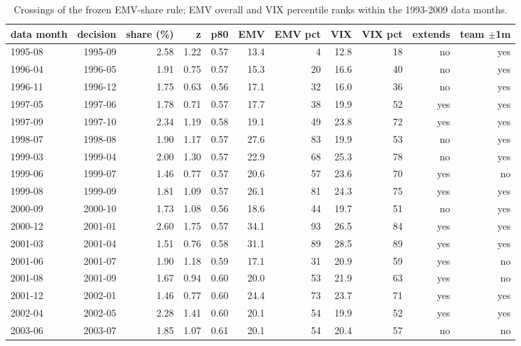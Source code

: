 \begin{table}[H]
\centering\footnotesize
\setlength{\tabcolsep}{4pt}
\caption{Crossings of the frozen EMV-share rule; EMV overall and VIX percentile ranks within the 1993-2009 data months.}
\label{tab:m8_crossings}
\begin{adjustbox}{max width=\linewidth}
\begin{tabular}{lrrrrrrrrrr}
\toprule
data month & decision & share (\%) & z & p80 & EMV & EMV pct & VIX & VIX pct & extends & team $\pm$1m \\
\midrule
1995-08 & 1995-09 & 2.58 & 1.22 & 0.57 & 13.4 & 4 & 12.8 & 18 & no & yes \\
1996-04 & 1996-05 & 1.91 & 0.75 & 0.57 & 15.3 & 20 & 16.6 & 40 & no & yes \\
1996-11 & 1996-12 & 1.75 & 0.63 & 0.56 & 17.1 & 32 & 16.0 & 36 & no & yes \\
1997-05 & 1997-06 & 1.78 & 0.71 & 0.57 & 17.7 & 38 & 19.9 & 52 & yes & yes \\
1997-09 & 1997-10 & 2.34 & 1.19 & 0.58 & 19.1 & 49 & 23.8 & 72 & yes & yes \\
1998-07 & 1998-08 & 1.90 & 1.17 & 0.57 & 27.6 & 83 & 19.9 & 53 & no & yes \\
1999-03 & 1999-04 & 2.00 & 1.30 & 0.57 & 22.9 & 68 & 25.3 & 78 & no & yes \\
1999-06 & 1999-07 & 1.46 & 0.77 & 0.57 & 20.6 & 57 & 23.6 & 70 & yes & no \\
1999-08 & 1999-09 & 1.81 & 1.09 & 0.57 & 26.1 & 81 & 24.3 & 75 & yes & yes \\
2000-09 & 2000-10 & 1.73 & 1.08 & 0.56 & 18.6 & 44 & 19.7 & 51 & no & yes \\
2000-12 & 2001-01 & 2.60 & 1.75 & 0.57 & 34.1 & 93 & 26.5 & 84 & yes & yes \\
2001-03 & 2001-04 & 1.51 & 0.76 & 0.58 & 31.1 & 89 & 28.5 & 89 & yes & yes \\
2001-06 & 2001-07 & 1.90 & 1.18 & 0.59 & 17.1 & 31 & 20.9 & 59 & yes & no \\
2001-08 & 2001-09 & 1.67 & 0.94 & 0.60 & 20.0 & 53 & 21.9 & 63 & yes & no \\
2001-12 & 2002-01 & 1.46 & 0.77 & 0.60 & 24.4 & 73 & 23.7 & 71 & yes & yes \\
2002-04 & 2002-05 & 2.28 & 1.41 & 0.60 & 20.1 & 54 & 19.9 & 52 & yes & yes \\
2003-06 & 2003-07 & 1.85 & 1.07 & 0.61 & 20.1 & 54 & 20.4 & 57 & no & no \\

\end{tabular}
\end{adjustbox}
\end{table}
